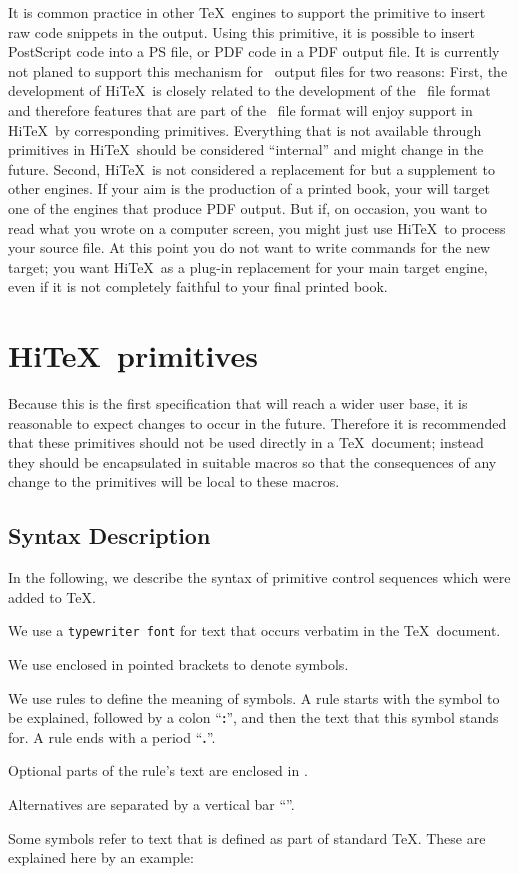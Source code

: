 It is common practice in other \TeX\ engines to support the  
primitive to insert raw code snippets in the output. Using this primitive,
it is possible to insert PostScript code into a PS file, or PDF code in a 
PDF output file. It is currently not planed to support this mechanism for
\HINT\ output files for two reasons: 
First, the development of Hi\TeX\ is closely related to the development of
the \HINT\ file format and therefore features that are part of the \HINT\
file format will enjoy support in Hi\TeX\ by corresponding primitives.
Everything that is not available through primitives in Hi\TeX\ should
be considered ``internal'' and might change in the future.
Second, Hi\TeX\ is not considered a replacement for but 
a supplement to other engines. If your aim is the production of a printed
book, your will target one of the engines that produce PDF output.
But if, on occasion, you want to read what you wrote on a computer screen,
you might just use Hi\TeX\ to process your source file. At this point you
do not want to write \ctl{special} commands for the new target; you want
Hi\TeX\ as a plug-in replacement for your main target engine, even if it
is not completely faithful to your final printed book.  

\section{Hi\TeX\ primitives}

Because this is the first specification that will reach a wider user base,
it is reasonable to expect changes to occur in the future. Therefore it is
recommended that these primitives should not be used directly in a
\TeX\ document; instead they should be encapsulated in suitable
macros so that the consequences of any change to the primitives will 
be local to these macros.

\subsection{Syntax Description}
In the following, we describe the syntax of primitive control sequences which were
added to \TeX.

\itemize
\item We use a {\tt typewriter font}
for text that occurs verbatim in the \TeX\ document.
\item We use \sym{italics} enclosed in pointed brackets to denote symbols.
\item We use rules\index{rule} to define the meaning of symbols.
A rule starts with the symbol
to be explained, followed by a colon ``{\bf :}'', and then the text that this symbol
stands for. A rule ends with a period ``{\bf .}''.
\item Optional parts of the rule's text
are enclosed in \opt{square brackets}.
\item Alternatives are separated by a vertical bar ``\OR''\index{\OR}.
\item Some symbols refer to text that is defined as part of standard \TeX. These are explained here by an example:

